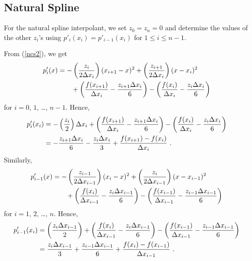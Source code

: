 \subsection{Natural Spline}

For the natural spline interpolant, we set $z_0 = z_n = 0$ and
determine the values of the other $z_i$'s using 
$p'_i(x_i) = p'_{i-1}(x_i)$ for $1\leq i \leq n-1$.

From (\ref{ncs2}), we get
\begin{equation} \label{ncs4}
\begin{split} 
p'_i(x) &= -\left(\frac{z_i}{2 \Delta{x_i}}\right) (x_{i+1}-x)^2
+ \left(\frac{z_{i+1}}{2 \Delta{x_i}}\right) (x-x_i)^2 \\
&\qquad + \left(\frac{f(x_{i+1})}{\Delta{x_i}}
-\frac{z_{i+1} \Delta{x_i}}{6}\right)
- \left( \frac{f(x_i)}{\Delta{x_i}}-\frac{z_i \Delta{x_i}}{6}\right)
\end{split}
\end{equation}
for $i=0$, $1$, \ldots, $n-1$.  Hence,
\begin{align*}
p'_i(x_i) &= -\left(\frac{z_i}{2}\right) \Delta{x_i}
+ \left(\frac{f(x_{i+1})}{\Delta{x_i}}-\frac{z_{i+1} \Delta{x_i}}{6}\right)
- \left( \frac{f(x_i)}{\Delta{x_i}}-\frac{z_i \Delta{x_i}}{6}\right) \\
&= -\frac{z_{i+1} \Delta{x_i}}{6} - \frac{z_i \Delta{x_i}}{3}
+ \frac{f(x_{i+1})-f(x_i)}{\Delta{x_i}} \ .
\end{align*}
Similarly,
\begin{align*}
p'_{i-1}(x) &= -\left(\frac{z_{i-1}}{2 \Delta{x_{i-1}}}\right) (x_i-x)^2
+ \left(\frac{z_i}{2 \Delta{x_{i-1}}}\right) (x-x_{i-1})^2 \\
&\qquad  + \left(\frac{f(x_i)}{\Delta{x_{i-1}}}
-\frac{z_i \Delta{x_{i-1}}}{6}\right)
- \left( \frac{f(x_{i-1})}{\Delta{x_{i-1}}}
- \frac{z_{i-1} \Delta{x_{i-1}}}{6}\right)
\end{align*}
for $i=1$, $2$, \ldots, $n$.  Hence,
\begin{align*}
p'_{i-1}(x_i) &= \left(\frac{z_i \Delta{x_{i-1}}}{2}\right)
+ \left(\frac{f(x_i)}{\Delta{x_{i-1}}}-\frac{z_i \Delta{x_{i-1}}}{6}\right)
- \left( \frac{f(x_{i-1})}{\Delta{x_{i-1}}}
- \frac{z_{i-1} \Delta{x_{i-1}}}{6}\right) \\
&= \frac{z_i \Delta{x_{i-1}}}{3} + \frac{z_{i-1} \Delta{x_{i-1}}}{6}
+ \frac{f(x_i)-f(x_{i-1})}{\Delta{x_{i-1}}} \ .
\end{align*}

